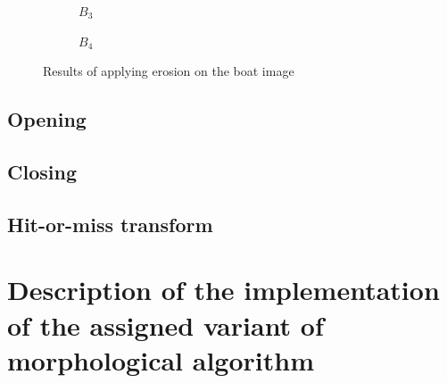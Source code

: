 \documentclass[12pt]{article}
\renewcommand{\subfiguresize}{.25\textwidth}
\begin{document}
\begin{figure}[H]
\begin{subfigure}[t]{\subfiguresize}
        \caption{$B_3$}
    \end{subfigure}
    \hspace{2em}
    \begin{subfigure}[t]{\subfiguresize}\centering
        \caption{$B_4$}
    \end{subfigure}
    \hspace{2em}
    \caption{Results of applying erosion on the boat image}
\end{figure} 

\subsection{Opening}

\subsection{Closing}

\subsection{Hit-or-miss transform}

\section{Description of the implementation of the assigned variant of morphological algorithm}
\end{document}
